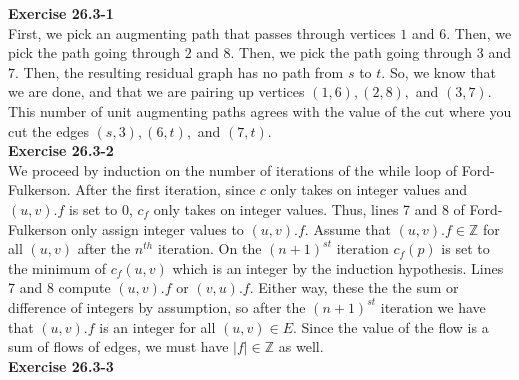 \documentclass{article}
\begin{document}
\noindent\textbf{Exercise 26.3-1}\\
First, we pick an augmenting path that passes through vertices $1 $ and $6$. Then, we pick the path going through $2$ and $8$. Then, we pick the path going through $3$ and $7$. Then, the resulting residual graph has no path from $s$ to $t$. So, we know that we are done, and that we are pairing up vertices $(1,6),(2,8),$ and $(3,7)$. This number of unit augmenting paths agrees with the value of the cut where you cut the edges $(s,3),(6,t),$ and $(7,t)$.\\


\noindent\textbf{Exercise 26.3-2}\\

We proceed by induction on the number of iterations of the while loop of Ford-Fulkerson.  After the first iteration, since $c$ only takes on integer values and $(u,v).f$ is set to 0, $c_f$ only takes on integer values.  Thus, lines 7 and 8 of Ford-Fulkerson only assign integer values to $(u,v).f$.  Assume that $(u,v).f \in \mathbb{Z}$ for all $(u,v)$ after the $n^{th}$ iteration.  On the $(n+1)^{st}$ iteration $c_f(p)$ is set to the minimum of $c_f(u,v)$ which is an integer by the induction hypothesis.  Lines 7 and 8 compute $(u,v).f$ or $(v,u).f$.  Either way, these the the sum or difference of integers by assumption, so after the $(n+1)^{st}$ iteration we have that $(u,v).f$ is an integer for all $(u,v) \in E$.  Since the value of the flow is a sum of flows of edges, we must have $|f| \in \mathbb{Z}$ as well.  \\

\noindent\textbf{Exercise 26.3-3}\\

\begin{comment}
We will try to show that any augmenting path that is found by Ford-Fulkerson must have length at most 5. To do this, we'll show the stronger fact that any augmenting path that is found will be of length 3 or 5. It is clear that the augmenting path cannot be of length less than 3 because we can separate the vertices of the flow network into four parts, $\{\{s\},L,R,\{t\}\}$ where all the edges only appear between $s$ and $L$, between $L$ and $R$, and between $R$ and $\{t\}$. This fact also gets us that there are no even length paths, so four is out.  Then, we will be done if we can show that no augmenting path that is found has length greater than $5$. To do this, we rely on the fact that since Bellman-Ford finds augmenting paths of shorter length first because it uses BFS to find augmenting paths. This means that to show that no augmenting path of length greater than $5$ will be found, we will show that if there is any augmenting path, then there must be one that is of length $5$ or less. Suppose that we have some augmenting path of length greater than $5$. 
\end{comment}
\end{document}
